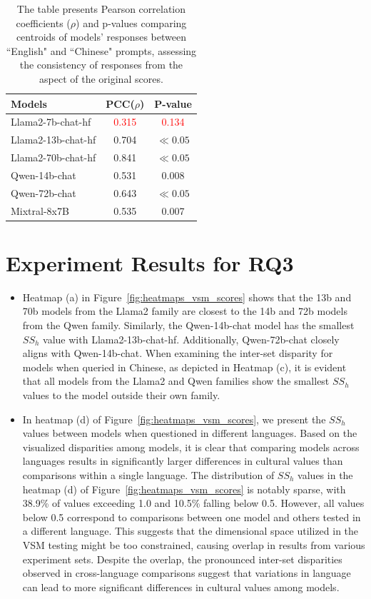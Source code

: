 \documentclass[11pt]{article}
\begin{document}
\begin{table}[t!]
\centering
\setlength\tabcolsep{4pt}
\renewcommand{\arraystretch}{1.25}
\begin{tabular}{l|c|c}
\hline
{{\textbf{Models}}} & {{\textbf{PCC($\rho$)}}} &
\multicolumn{1}{c}{{\textbf{P-value}}} \\
\hline
{Llama2-7b-chat-hf} & \textcolor{red}{0.315} & \textcolor{red}{0.134} \\
{Llama2-13b-chat-hf} & 0.704 &  $\ll 0.05$ \\
{Llama2-70b-chat-hf} &  0.841 &  $\ll 0.05$ \\
{Qwen-14b-chat} & 0.531 & 0.008 \\
{Qwen-72b-chat} & 0.643 & $\ll 0.05$ \\
{Mixtral-8x7B} & 0.535 & 0.007 \\
\bottomrule
\end{tabular}
\caption{ The table presents Pearson correlation coefficients ($\rho$) and p-values comparing centroids of models' responses between ``English" and ``Chinese" prompts, assessing the consistency of responses from the aspect of the original scores.}
\label{tab:pearson_correlation_language}
\end{table}


\section{Experiment Results for RQ3}
\label{appendix:RQ3}
\begin{itemize}
    \item Heatmap (a) in Figure~\ref{fig:heatmaps_vsm_scores} shows that the 13b and 70b models from the Llama2 family are closest to the 14b and 72b models from the Qwen family. Similarly, the Qwen-14b-chat model has the smallest $SS_h$ value with Llama2-13b-chat-hf. Additionally, Qwen-72b-chat closely aligns with Qwen-14b-chat. When examining the inter-set disparity for models when queried in Chinese, as depicted in Heatmap (c), it is evident that all models from the Llama2 and Qwen families show the smallest $SS_h$ values to the model outside their own family.
    \item In heatmap (d) of Figure~\ref{fig:heatmaps_vsm_scores}, we present the $SS_h$ values between models when questioned in different languages. Based on the visualized disparities among models, it is clear that comparing models across languages results in significantly larger differences in cultural values than comparisons within a single language. The distribution of $SS_h$ values in the heatmap (d) of Figure~\ref{fig:heatmaps_vsm_scores} is notably sparse, with 38.9\% of values exceeding 1.0 and 10.5\% falling below 0.5. However, all values below 0.5 correspond to comparisons between one model and others tested in a different language. This suggests that the dimensional space utilized in the VSM testing might be too constrained, causing overlap in results from various experiment sets. Despite the overlap, the pronounced inter-set disparities observed in cross-language comparisons suggest that variations in language can lead to more significant differences in cultural values among models.
\end{itemize}
\end{document}
